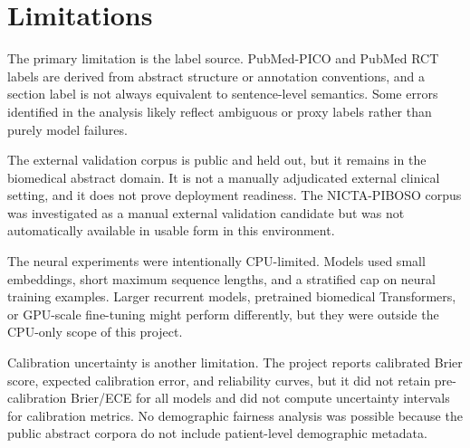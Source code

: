 \section*{Limitations}
The primary limitation is the label source. PubMed-PICO and PubMed RCT labels are derived from abstract structure or annotation conventions, and a section label is not always equivalent to sentence-level semantics. Some errors identified in the analysis likely reflect ambiguous or proxy labels rather than purely model failures.

The external validation corpus is public and held out, but it remains in the biomedical abstract domain. It is not a manually adjudicated external clinical setting, and it does not prove deployment readiness. The NICTA-PIBOSO corpus was investigated as a manual external validation candidate but was not automatically available in usable form in this environment.

The neural experiments were intentionally CPU-limited. Models used small embeddings, short maximum sequence lengths, and a stratified cap on neural training examples. Larger recurrent models, pretrained biomedical Transformers, or GPU-scale fine-tuning might perform differently, but they were outside the CPU-only scope of this project.

Calibration uncertainty is another limitation. The project reports calibrated Brier score, expected calibration error, and reliability curves, but it did not retain pre-calibration Brier/ECE for all models and did not compute uncertainty intervals for calibration metrics. No demographic fairness analysis was possible because the public abstract corpora do not include patient-level demographic metadata.
